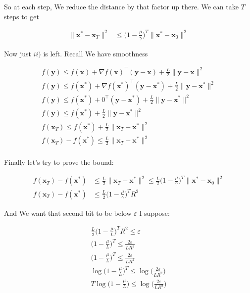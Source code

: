 \documentclass{article}
\begin{document}
			So at each step, We reduce the distance by that factor up there. We can take $T$ steps to get
			
			\begin{align*}
				\| \mathbf{x}^* - \mathbf{x}_{T} \|^2&\le   \bigg(1- \frac{\mu}{\gamma} \bigg)^T \|\mathbf{x}^*-\mathbf{x}_0\|^2 
			\end{align*}
			
			Now just $ii)$ is left. Recall We have smoothness
			
			\begin{align*}
				f(\mathbf{y}) \le f(\mathbf{x}) + \nabla f(\mathbf{x})^\top(\mathbf{y-x}) + \frac{L}{2} \| \mathbf{y-x}\|^2\\
				f(\mathbf{y}) \le f(\mathbf{x^*}) + \nabla f(\mathbf{x^*})^\top(\mathbf{y-x^*}) + \frac{L}{2} \| \mathbf{y-x^*}\|^2\\
				f(\mathbf{y}) \le f(\mathbf{x^*}) + 0^\top(\mathbf{y-x^*}) + \frac{L}{2} \| \mathbf{y-x^*}\|^2\\
				f(\mathbf{y}) \le f(\mathbf{x^*})  + \frac{L}{2} \| \mathbf{y-x^*}\|^2\\
				f(\mathbf{x}_T) \le f(\mathbf{x^*})  + \frac{L}{2} \| \mathbf{x}_T-\mathbf{x^*}\|^2\\
				f(\mathbf{x}_T) - f(\mathbf{x^*}) \le  \frac{L}{2} \| \mathbf{x}_T-\mathbf{x^*}\|^2\\
			\end{align*}
			
			Finally let's try to prove the bound:
			
			\begin{align*}
				f(\mathbf{x}_T) - f(\mathbf{x^*}) &\le  \frac{L}{2} \| \mathbf{x}_T-\mathbf{x^*}\|^2 \le  \frac{L}{2} \bigg(1- \frac{\mu}{\gamma} \bigg)^T \|\mathbf{x}^*-\mathbf{x}_0\|^2 \\
				f(\mathbf{x}_T) - f(\mathbf{x^*})  &\le  \frac{L}{2} \bigg(1- \frac{\mu}{\gamma} \bigg)^T R^2
			\end{align*}
			
			And We want that second bit to be below $\varepsilon$ I suppose:
			
			\begin{align*}
				\frac{L}{2} \bigg(1- \frac{\mu}{L} \bigg)^T R^2 \le \varepsilon\\
				\bigg(1- \frac{\mu}{L} \bigg)^T \le \frac{2\varepsilon}{LR^2}\\
				\bigg(1- \frac{\mu}{L} \bigg)^T \le \frac{2\varepsilon}{LR^2}\\
				\log \bigg(1- \frac{\mu}{L} \bigg)^T \le \log\bigg( \frac{2\varepsilon}{LR^2}\bigg) \\
				T\log \bigg(1- \frac{\mu}{L} \bigg) \le \log\bigg( \frac{2\varepsilon}{LR^2}\bigg) \\
			\end{align*}
			
\end{document}
